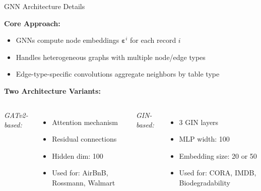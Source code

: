 \begin{frame}[fragile]{GNN Architecture Details}

\textbf{Core Approach:}
\begin{itemize}
  \item GNNs compute node embeddings $\boldsymbol{\varepsilon}^i$ for each record $i$
  \item Handles heterogeneous graphs with multiple node/edge types
  \item Edge-type-specific convolutions aggregate neighbors by table type
\end{itemize}

\textbf{Two Architecture Variants:}
\begin{columns}[T,onlytextwidth]
  \textit{GATv2-based:} \citet{brody2021attentive}
  \begin{itemize}
    \item Attention mechanism
    \item Residual connections
    \item Hidden dim: 100
    \item Used for: AirBnB, Rossmann, Walmart
  \end{itemize}
  
  \textit{GIN-based:} \citet{xu2018powerful}
  \begin{itemize}
    \item 3 GIN layers
    \item MLP width: 100
    \item Embedding size: 20 or 50
    \item Used for: CORA, IMDB, Biodegradability
  \end{itemize}
\end{columns}

\end{frame}


